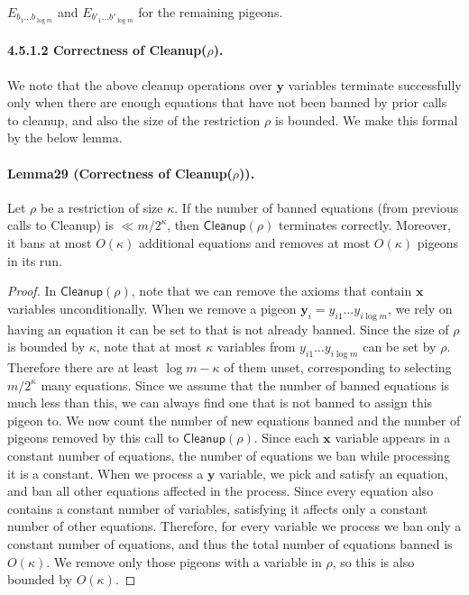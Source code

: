 \documentclass[10pt,a4paper]{article}
\begin{document}
$E_{b_1\ldots b_{\log m}}$ and $E_{b'_1\ldots b'_{\log m}}$ for the remaining pigeons.
\paragraph{4.5.1.2 Correctness of Cleanup($\rho$).}
We note that the above cleanup operations over $\mathbf y$ variables terminate successfully only when there are enough equations that have not been banned by prior calls to cleanup, and also the size of the restriction $\rho$ is bounded. We make this formal by the below lemma.
\paragraph{Lemma29 (Correctness of Cleanup($\rho$)).} Let $\rho$ be a restriction of size $\kappa$. If the number of banned equations (from previous calls to Cleanup) is $\ll m/2^{\kappa}$, then $\mathsf{Cleanup}(\rho)$ terminates correctly. Moreover, it bans at most $O(\kappa)$ additional equations and removes at most $O(\kappa)$ pigeons in its run.
\begin{proof}
In $\mathsf{Cleanup}(\rho)$, note that we can remove the axioms that contain $\mathbf x$ variables unconditionally. When we remove a pigeon $\mathbf y_i=y_{i1}\ldots y_{i\log m}$, we rely on having an equation it can be set to that is not already banned. Since the size of $\rho$ is bounded by $\kappa$, note that at most $\kappa$ variables from $y_{i1}\ldots y_{i\log m}$ can be set by $\rho$. Therefore there are at least $\log m-\kappa$ of them unset, corresponding to selecting $m/2^{\kappa}$ many equations. Since we assume that the number of banned equations is much less than this, we can always find one that is not banned to assign this pigeon to.
We now count the number of new equations banned and the number of pigeons removed by this call to $\mathsf{Cleanup}(\rho)$. Since each $\mathbf x$ variable appears in a constant number of equations, the number of equations we ban while processing it is a constant. When we process a $\mathbf y$ variable, we pick and satisfy an equation, and ban all other equations affected in the process. Since every equation also contains a constant number of variables, satisfying it affects only a constant number of other equations. Therefore, for every variable we process we ban only a constant number of equations, and thus the total number of equations banned is $O(\kappa)$. We remove only those pigeons with a variable in $\rho$, so this is also bounded by $O(\kappa)$.
\end{proof}
\end{document}
